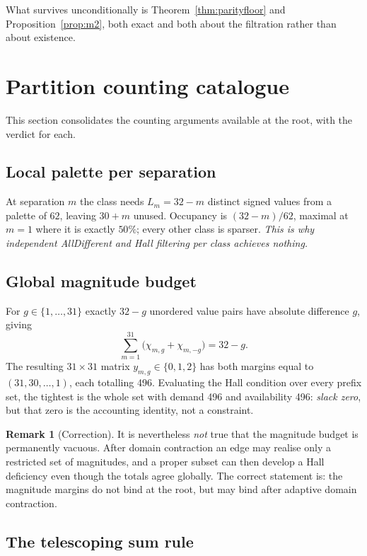 \documentclass[11pt,a4paper]{article}
\theoremstyle{definition}
\newtheorem{remark}[theorem]{Remark}
\begin{document}
What survives unconditionally is Theorem~\ref{thm:parityfloor} and
Proposition~\ref{prop:m2}, both exact and both about the filtration rather than
about existence.

\section{Partition counting catalogue}
\label{sec:partition}

This section consolidates the counting arguments available at the root, with the
verdict for each.

\subsection{Local palette per separation}

At separation $m$ the class needs $L_m=32-m$ distinct signed values from a
palette of $62$, leaving $30+m$ unused. Occupancy is
$(32-m)/62$, maximal at $m=1$ where it is exactly $50\%$; every other class is
sparser. \emph{This is why independent AllDifferent and Hall filtering per class
achieves nothing.}

\subsection{Global magnitude budget}

For $g\in\{1,\dots,31\}$ exactly $32-g$ unordered value pairs have absolute
difference $g$, giving
\[
\sum_{m=1}^{31}\bigl(\chi_{m,g}+\chi_{m,-g}\bigr) = 32-g .
\]
The resulting $31\times31$ matrix $y_{m,g}\in\{0,1,2\}$ has both margins equal to
$(31,30,\dots,1)$, each totalling 496. Evaluating the Hall condition over every
prefix set, the tightest is the whole set with demand 496 and availability 496:
\emph{slack zero}, but that zero is the accounting identity, not a constraint.

\begin{remark}[Correction]
It is nevertheless \emph{not} true that the magnitude budget is permanently
vacuous. After domain contraction an edge may realise only a restricted set of
magnitudes, and a proper subset can then develop a Hall deficiency even though
the totals agree globally. The correct statement is: the magnitude margins do
not bind at the root, but may bind after adaptive domain contraction.
\end{remark}

\subsection{The telescoping sum rule}
\label{sec:sumrule}
\end{document}
